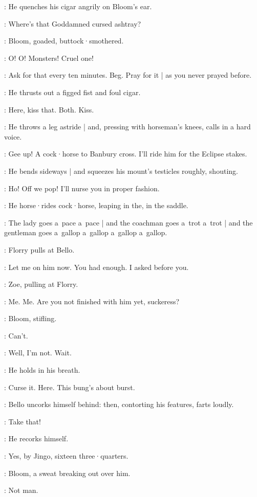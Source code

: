 :
He quenches his cigar angrily on Bloom's ear.

\Bello:
Where's that Goddamned cursed ashtray?

:
Bloom,
goaded,
buttock·smothered.

\Bloom:
O!
O!
Monsters!
Cruel one!

\Bello:
%
Ask for that every ten minutes.
Beg.
Pray for it |
as you never prayed before.

:
He thrusts out a figged fist and foul cigar.

\Bello:
Here,
kiss that.
Both.
Kiss.

:
He throws a leg astride |
and,
pressing with horseman's knees,
calls in a hard voice.

\Bello:
Gee up!
A cock·horse to Banbury cross.
I'll ride him for the Eclipse stakes.

:
He bends sideways |
and squeezes his mount's testicles roughly,
shouting.

\Bello:
Ho!
Off we pop!
I'll nurse you in proper fashion.

:
He horse·rides cock·horse,
leaping in the,
in the saddle.

\Bello:
The lady goes a~pace a~pace |
and the coachman goes a~trot a~trot |
and the gentleman goes a~gallop a~gallop a~gallop a~gallop.

:
Florry pulls at Bello.%

\Florry:
Let me on him now.
You had enough.
I asked before you.

:
Zoe,
pulling at Florry.

\Zoe:
Me.
Me.
Are you not finished with him yet,
suckeress?

:
Bloom,
stifling.

\Bloom:
Can't.

\Bello:
Well,
I'm not.
Wait.

:
He holds in his breath.

\Bello:
Curse it.
Here.
This bung's about burst.

:
Bello uncorks himself behind:
then,
contorting his features,
farts loudly.

\Bello:
Take that!

:
He recorks himself.

\Bello:
Yes,
by Jingo,
sixteen three·quarters.%

:
Bloom,
a sweat breaking out over him.

\Bloom:
Not man.

